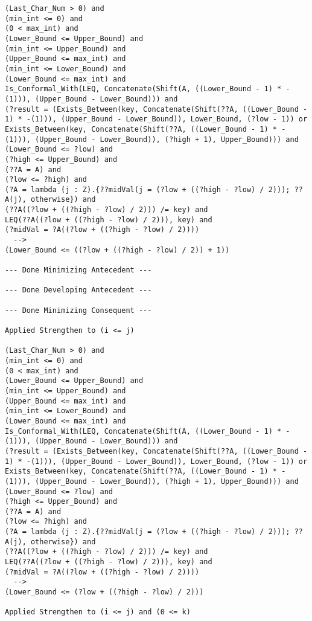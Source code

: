 \begin{lstlisting}[language=resolve]
(Last_Char_Num > 0) and
(min_int <= 0) and
(0 < max_int) and
(Lower_Bound <= Upper_Bound) and
(min_int <= Upper_Bound) and
(Upper_Bound <= max_int) and
(min_int <= Lower_Bound) and
(Lower_Bound <= max_int) and
Is_Conformal_With(LEQ, Concatenate(Shift(A, ((Lower_Bound - 1) * -(1))), (Upper_Bound - Lower_Bound))) and
(?result = (Exists_Between(key, Concatenate(Shift(??A, ((Lower_Bound - 1) * -(1))), (Upper_Bound - Lower_Bound)), Lower_Bound, (?low - 1)) or Exists_Between(key, Concatenate(Shift(??A, ((Lower_Bound - 1) * -(1))), (Upper_Bound - Lower_Bound)), (?high + 1), Upper_Bound))) and
(Lower_Bound <= ?low) and
(?high <= Upper_Bound) and
(??A = A) and
(?low <= ?high) and
(?A = lambda (j : Z).{??midVal(j = (?low + ((?high - ?low) / 2))); ??A(j), otherwise}) and
(??A((?low + ((?high - ?low) / 2))) /= key) and
LEQ(??A((?low + ((?high - ?low) / 2))), key) and
(?midVal = ?A((?low + ((?high - ?low) / 2))))
  -->
(Lower_Bound <= ((?low + ((?high - ?low) / 2)) + 1))

--- Done Minimizing Antecedent ---

--- Done Developing Antecedent ---

--- Done Minimizing Consequent ---

Applied Strengthen to (i <= j)

(Last_Char_Num > 0) and
(min_int <= 0) and
(0 < max_int) and
(Lower_Bound <= Upper_Bound) and
(min_int <= Upper_Bound) and
(Upper_Bound <= max_int) and
(min_int <= Lower_Bound) and
(Lower_Bound <= max_int) and
Is_Conformal_With(LEQ, Concatenate(Shift(A, ((Lower_Bound - 1) * -(1))), (Upper_Bound - Lower_Bound))) and
(?result = (Exists_Between(key, Concatenate(Shift(??A, ((Lower_Bound - 1) * -(1))), (Upper_Bound - Lower_Bound)), Lower_Bound, (?low - 1)) or Exists_Between(key, Concatenate(Shift(??A, ((Lower_Bound - 1) * -(1))), (Upper_Bound - Lower_Bound)), (?high + 1), Upper_Bound))) and
(Lower_Bound <= ?low) and
(?high <= Upper_Bound) and
(??A = A) and
(?low <= ?high) and
(?A = lambda (j : Z).{??midVal(j = (?low + ((?high - ?low) / 2))); ??A(j), otherwise}) and
(??A((?low + ((?high - ?low) / 2))) /= key) and
LEQ(??A((?low + ((?high - ?low) / 2))), key) and
(?midVal = ?A((?low + ((?high - ?low) / 2))))
  -->
(Lower_Bound <= (?low + ((?high - ?low) / 2)))

Applied Strengthen to (i <= j) and (0 <= k)


\end{lstlisting}
